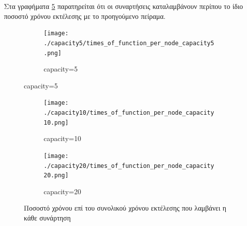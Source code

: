 \documentclass{article}
\newcommand{\eng}[1]{\foreignlanguage{english}{#1}} %
\begin{document}

Στα γραφήματα \ref{fig:scalability-funcs} παρατηρείται ότι οι συναρτήσεις
καταλαμβάνουν περίπου το ίδιο ποσοστό χρόνου εκτέλεσης με το προηγούμενο
πείραμα.

\begin{figure}[ht]
    \centering
    \begin{subfigure}{\textwidth}
        \texttt{[image: ./capacity5/times\_of\_function\_per\_node\_capacity5.png]}
        \caption{\eng{capacity=5}}
        \label{fig:scalability-funcs-5}
    \end{subfigure}
\end{figure}
\begin{figure}[ht]
    \ContinuedFloat
    \begin{subfigure}{\textwidth}
        \texttt{[image: ./capacity10/times\_of\_function\_per\_node\_capacity10.png]}
        \caption{\eng{capacity=10}}
        \label{fig:scalability-funcs-10}
    \end{subfigure}
    \centering
    \begin{subfigure}{\textwidth}
        \texttt{[image: ./capacity20/times\_of\_function\_per\_node\_capacity20.png]}
        \caption{\eng{capacity=20}}
        \label{fig:scalability-funcs-20}
    \end{subfigure}
    \caption{Ποσοστό χρόνου επί του συνολικού χρόνου εκτέλεσης που λαμβάνει η κάθε συνάρτηση}
    \label{fig:scalability-funcs}
\end{figure}
\FloatBarrier

\end{document}
